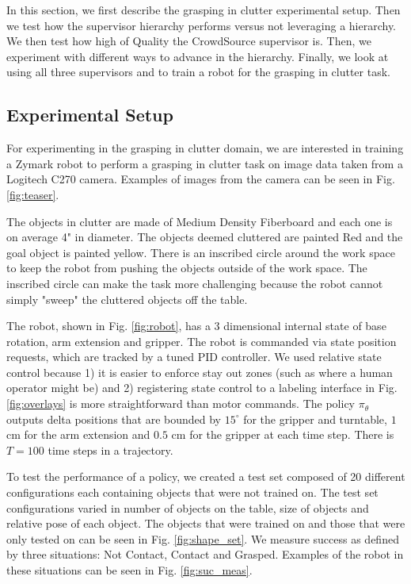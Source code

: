 \documentclass[10pt, conference]{ieeeconf}      %
\begin{document}
In this section, we first describe the grasping in clutter experimental setup. Then we test how the supervisor hierarchy performs versus not leveraging a hierarchy. We then test how high of Quality the CrowdSource supervisor is. Then, we experiment with different ways to advance in the hierarchy. Finally, we look at using all three supervisors and to train a robot for the grasping in clutter task. 

\subsection{Experimental Setup}
For experimenting in the grasping in clutter domain, we are interested in training a Zymark robot to perform a grasping in clutter task on image data taken from a Logitech C270 camera. Examples of images from the camera can be seen in Fig. \ref{fig:teaser}.

The objects in clutter are made of Medium Density Fiberboard and each one is on average 4" in diameter. The objects deemed cluttered are painted Red and the goal object is painted yellow. There is an inscribed circle around the work space to keep the robot from pushing the objects outside of the work space. The inscribed circle can make the task more challenging because the robot cannot simply "sweep" the cluttered objects off the table. 

The robot, shown in Fig. \ref{fig:robot}, has a 3 dimensional internal state of base rotation, arm extension and gripper. The robot is commanded via state position requests, which are tracked by a tuned PID controller. We used relative state control because 1) it is easier to enforce stay out zones (such as where a human operator might be)  and 2) registering state control to a labeling interface in Fig. \ref{fig:overlays} is more straightforward than motor commands.   The policy $\pi_\theta$ outputs delta positions that are bounded by $15^\circ$ for the gripper and turntable, $1$ cm for the arm extension and $0.5$ cm for the gripper at each time step. There is $T=100$ time steps in a trajectory. 

To test the performance of a policy, we created a test set composed of 20 different configurations each containing objects that were not trained on.  The test set configurations varied in number of objects on the table, size of objects and relative pose of each object. The objects that were trained on and those that were only tested on can be seen in Fig. \ref{fig:shape_set}.  We measure success as defined by three situations: Not Contact, Contact and Grasped. Examples of the robot in these situations can be seen in Fig. \ref{fig:suc_meas}. 
\end{document}
